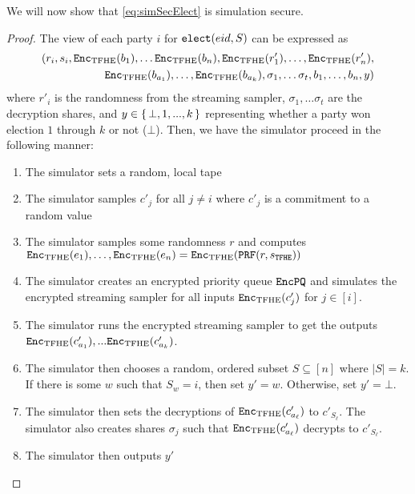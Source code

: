 \begin{lemma}
	We will now show that \cref{eq:simSecElect} is simulation secure.
	\begin{proof}
		The view of each party $i$ for $\texttt{elect}({eid}, S)$ can be expressed as
		\begin{align*}
			(r_i,  s_i, \texttt{Enc}_{\mathrm{TFHE}}(b_{1}), \dots \texttt{Enc}_{\mathrm{TFHE}}(b_n), \texttt{Enc}_{\mathrm{TFHE}}(r'_1), \dots, \texttt{Enc}_{\mathrm{TFHE}}(r'_n), \\
			\texttt{Enc}_{\mathrm{TFHE}}(b_{a_1}), \dots, \texttt{Enc}_{\mathrm{TFHE}}(b_{a_k}), \sigma_1, \dots \sigma_t, b_1, \dots, b_n, y)
		\end{align*}
		where $r'_i$ is the randomness from the streaming sampler, $\sigma_1, \dots \sigma_t$ are the decryption shares,
		and $y \in \set{\bot, 1, ..., k}$ representing whether a party won election $1$ through $k$ or not ($\bot$).
		Then, we have the simulator proceed in the following manner:
		\begin{enumerate}
			\item The simulator sets a random, local tape
			\item The simulator samples $c'_j$ for all $j \neq i$ where $c'_j$ is a commitment to a random value
			\item The simulator samples some randomness $r$ and computes $\texttt{Enc}_{\mathrm{TFHE}}(e_1), \dots, \texttt{Enc}_{\mathrm{TFHE}}(e_n) = \texttt{Enc}_{\mathrm{TFHE}}(\texttt{PRF}(r, s_\texttt{TFHE}))$
			\item The simulator creates an encrypted priority queue $\texttt{EncPQ}$ and simulates the encrypted streaming sampler for all inputs $\texttt{Enc}_{\mathrm{TFHE}}(c'_j)$ for $j \in [i]$.
			\item The simulator runs the encrypted streaming sampler to get the outputs $\texttt{Enc}_{\mathrm{TFHE}}(c'_{a_1}),... \texttt{Enc}_{\mathrm{TFHE}}(c'_{a_k})$.
			\item The simulator then chooses a random, ordered subset $S \subseteq [n]$ where $|S| = k$.
			      If there is some $w$ such that $S_w = i$, then set $y' = w$. Otherwise, set $y' = \bot$.
			\item The simulator then sets the decryptions of $\texttt{Enc}_{\mathrm{TFHE}}(c'_{a_\ell})$ to $c'_{S_\ell}$.
			      The simulator also creates shares $\sigma_j$ such that $\texttt{Enc}_{\mathrm{TFHE}}(c'_{a_\ell})$ decrypts to $c'_{S_\ell}$.
			\item The simulator then outputs $y'$


\end{enumerate}
\end{proof}
\end{lemma}
